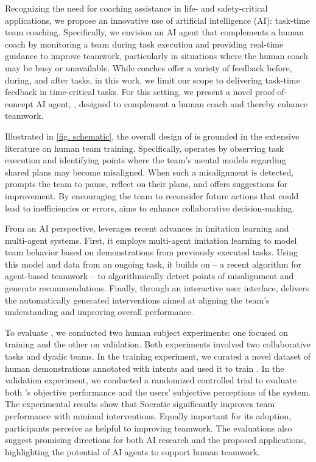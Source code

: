 Recognizing the need for coaching assistance in life- and safety-critical applications, we propose an innovative use of artificial intelligence (AI): task-time team coaching. Specifically, we envision an AI agent that complements a human coach by monitoring a team during task execution and providing real-time guidance to improve teamwork, particularly in situations where the human coach may be busy or unavailable. While coaches offer a variety of feedback before, during, and after tasks, in this work, we limit our scope to delivering task-time feedback in time-critical tasks. For this setting, we present a novel proof-of-concept AI agent, \coach, designed to complement a human coach and thereby enhance teamwork.

Illustrated in \cref{fig. schematic}, the overall design of \coach is grounded in the extensive literature on human team training. Specifically, \coach operates by observing task execution and identifying points where the team's mental models regarding shared plans may become misaligned. When such a misalignment is detected, \coach prompts the team to pause, reflect on their plans, and offers suggestions for improvement. By encouraging the team to reconsider future actions that could lead to inefficiencies or errors, \coach aims to enhance collaborative decision-making. 

From an AI perspective, \coach leverages recent advances in imitation learning and multi-agent systems. First, it employs multi-agent imitation learning to model team behavior based on demonstrations from previously executed tasks. Using this model and data from an ongoing task, it builds on \tic -- a recent algorithm for agent-based teamwork -- to algorithmically detect points of misalignment and generate recommendations. Finally, through an interactive user interface, \coach delivers the automatically generated interventions aimed at aligning the team's understanding and improving overall performance.

To evaluate \coach, we conducted two human subject experiments: one focused on training and the other on validation. Both experiments involved two collaborative tasks and dyadic teams. In the training experiment, we curated a novel dataset of human demonstrations annotated with intents and used it to train \coach. In the validation experiment, we conducted a randomized controlled trial to evaluate both \coach's objective performance and the users' subjective perceptions of the system. The experimental results show that Socratic significantly improves team performance with minimal interventions. Equally important for its adoption, participants perceive \coach as helpful to improving teamwork. The evaluations also suggest promising directions for both AI research and the proposed applications, highlighting the potential of AI agents to support human teamwork.
